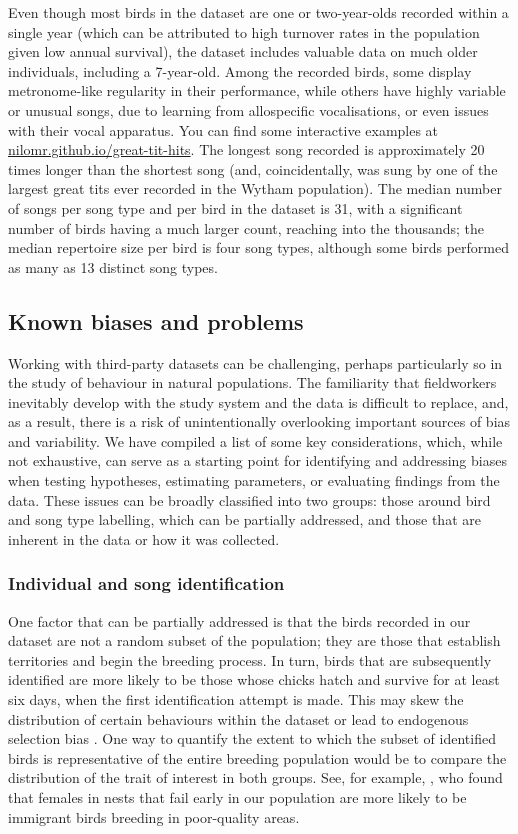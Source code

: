 Even though most birds in the dataset are one or two-year-olds recorded within a single year (which can be attributed to high turnover rates in the population given low annual survival), the dataset includes valuable data on much older individuals, including a 7-year-old. Among the recorded birds, some display metronome-like regularity in their performance, while others have highly variable or unusual songs, due to learning from allospecific vocalisations, or even issues with their vocal apparatus. You can find some interactive examples at \href{https://nilomr.github.io/great-tit-hits/}{nilomr.github.io/great-tit-hits}. The longest song recorded is approximately 20 times longer than the shortest song (and, coincidentally, was sung by one of the largest great tits ever recorded in the Wytham population). The median number of songs per song type and per bird in the dataset is 31, with a significant number of birds having a much larger count, reaching into the thousands; the median repertoire size per bird is four song types, although some birds performed as many as 13 distinct song types.

\subsection{Known biases and problems}

Working with third-party datasets can be challenging, perhaps particularly so in the study of behaviour in natural populations. The familiarity that fieldworkers inevitably develop with the study system and the data is difficult to replace, and, as a result, there is a risk of unintentionally overlooking important sources of bias and variability. We have compiled a list of some key considerations, which, while not exhaustive, can serve as a starting point for identifying and addressing biases when testing hypotheses, estimating parameters, or evaluating findings from the data. These issues can be broadly classified into two groups: those around bird and song type labelling, which can be partially addressed, and those that are inherent in the data or how it was collected.


\subsubsection{Individual and song identification}

One factor that can be partially addressed is that the birds recorded in our dataset are not a random subset of the population; they are those that establish territories and begin the breeding process. In turn, birds that are subsequently identified are more likely to be those whose chicks hatch and survive for at least six days, when the first identification attempt is made. This may skew the distribution of certain behaviours within the dataset or lead to endogenous selection bias \parencite{elwert2014}. One way to quantify the extent to which the subset of identified birds is representative of the entire breeding population would be to compare the distribution of the trait of interest in both groups. See, for example, \cite{kidd2015}, who found that females in nests that fail early in our population are more likely to be immigrant birds breeding in poor-quality areas.

